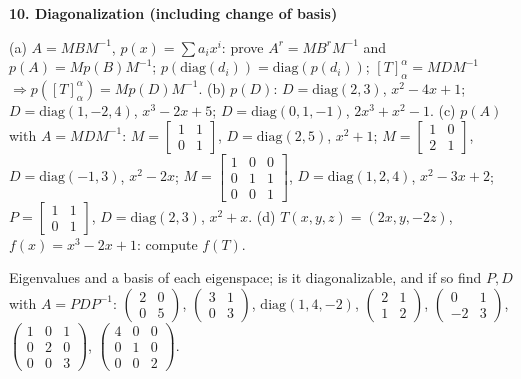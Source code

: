 \documentclass[9pt]{article}
\newcommand{\sub}[1]{\vspace{3pt}\par{\bfseries\color{NAVY}#1}\nopagebreak\par}
\newcommand{\bi}[2]{\par\noindent\hangindent=1.25cm\hangafter=1\makebox[1.25cm][l]{\textbf{\footnotesize #1}}#2\par}
\begin{document}
\sub{10. Diagonalization (including change of basis)}
\bi{EV1}{(a) $A=MBM^{-1}$, $p(x)=\sum a_ix^i$: prove $A^r=MB^rM^{-1}$ and $p(A)=Mp(B)M^{-1}$; $p(\mathrm{diag}(d_i))=\mathrm{diag}(p(d_i))$; $[T]_\alpha^\alpha=M D M^{-1}$ $\Rightarrow p([T]_\alpha^\alpha)=Mp(D)M^{-1}$. (b) $p(D)$: $D=\mathrm{diag}(2,3)$, $x^2{-}4x{+}1$; $D=\mathrm{diag}(1,-2,4)$, $x^3{-}2x{+}5$; $D=\mathrm{diag}(0,1,-1)$, $2x^3{+}x^2{-}1$. (c) $p(A)$ with $A=MDM^{-1}$: $M=\left[\begin{smallmatrix}1&1\\0&1\end{smallmatrix}\right]$, $D=\mathrm{diag}(2,5)$, $x^2{+}1$; $M=\left[\begin{smallmatrix}1&0\\2&1\end{smallmatrix}\right]$, $D=\mathrm{diag}(-1,3)$, $x^2{-}2x$; $M=\left[\begin{smallmatrix}1&0&0\\0&1&1\\0&0&1\end{smallmatrix}\right]$, $D=\mathrm{diag}(1,2,4)$, $x^2{-}3x{+}2$; $P=\left[\begin{smallmatrix}1&1\\0&1\end{smallmatrix}\right]$, $D=\mathrm{diag}(2,3)$, $x^2{+}x$. (d) $T(x,y,z)=(2x,y,-2z)$, $f(x)=x^3{-}2x{+}1$: compute $f(T)$.}
\bi{EV2}{Eigenvalues and a basis of each eigenspace; is it diagonalizable, and if so find $P,D$ with $A=PDP^{-1}$: $\begin{pmatrix}2&0\\0&5\end{pmatrix}$, $\begin{pmatrix}3&1\\0&3\end{pmatrix}$, $\mathrm{diag}(1,4,-2)$, $\begin{pmatrix}2&1\\1&2\end{pmatrix}$, $\begin{pmatrix}0&1\\-2&3\end{pmatrix}$, $\begin{pmatrix}1&0&1\\0&2&0\\0&0&3\end{pmatrix}$, $\begin{pmatrix}4&0&0\\0&1&0\\0&0&2\end{pmatrix}$.}
\end{document}
